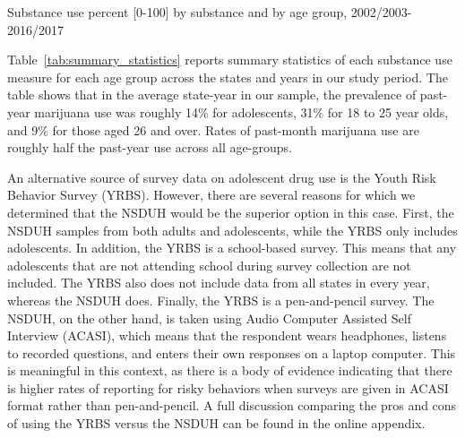 \documentclass[12pt]{article}%
\begin{document}
    \begin{table}[ht]\centering
            \begin{adjustbox}{width=\textwidth}
            \centering
              \begin{threeparttable}
                \caption{Substance use percent [0-100] by substance and by age group, 2002/2003-2016/2017}
                \label{tab:summary_statistics}
              \end{threeparttable}
             \end{adjustbox}
        \end{table}

Table~\ref{tab:summary_statistics} reports summary statistics of each substance use measure for each age group across the states and years in our study period. The table shows that in the average state-year in our sample, the prevalence of past-year marijuana use was roughly 14\% for adolescents, 31\% for 18 to 25 year olds, and 9\% for those aged 26 and over. Rates of past-month marijuana use are roughly half the past-year use across all age-groups. 

An alternative source of survey data on adolescent drug use is the Youth Risk Behavior Survey (YRBS). However, there are several reasons for which we determined that the NSDUH would be the superior option in this case. First, the NSDUH samples from both adults and adolescents, while the YRBS only includes adolescents. In addition, the YRBS is a school-based survey. This means that any adolescents that are not attending school during survey collection are not included. The YRBS also does not include data from all states in every year, whereas the NSDUH does. Finally, the YRBS is a pen-and-pencil survey. The NSDUH, on the other hand, is taken using Audio Computer Assisted Self Interview (ACASI), which means that the respondent wears headphones, listens to recorded questions, and enters their own responses on a laptop computer. This is meaningful in this context, as there is a body of evidence indicating that there is higher rates of reporting for risky behaviors when surveys are given in ACASI format rather than pen-and-pencil. A full discussion comparing the pros and cons of using the YRBS versus the NSDUH can be found in the online appendix. 
\end{document}
